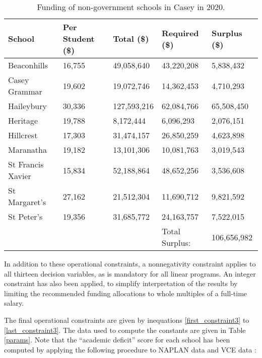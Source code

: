 \documentclass[11pt, a4paper]{article}
\begin{document}
    \begin{table}[!ht]
        \centering
        \caption{Funding of non-government schools in Casey in 2020.}
        \begin{tabular}{|l|l|l|l|l|}
        \hline
            School & Per Student (\$) & Total (\$) & Required (\$)  & Surplus (\$)  \\ \hline
            Beaconhills & 16,755 & 49,058,640 & 43,220,208 & 5,838,432  \\ \hline
            Casey Grammar & 19,602 & 19,072,746 & 14,362,453 & 4,710,293  \\ \hline
            Haileybury & 30,336 & 127,593,216 & 62,084,766 & 65,508,450  \\ \hline
            Heritage & 19,788 & 8,172,444 & 6,096,293 & 2,076,151  \\ \hline
            Hillcrest & 17,303 & 31,474,157 & 26,850,259 & 4,623,898  \\ \hline
            Maranatha & 19,182 & 13,101,306 & 10,081,763 & 3,019,543  \\ \hline
            St Francis Xavier & 15,834 & 52,188,864 & 48,652,256 & 3,536,608  \\ \hline
            St Margaret's & 27,162 & 21,512,304 & 11,690,712 & 9,821,592  \\ \hline
            St Peter's & 19,356 & 31,685,772 & 24,163,757 & 7,522,015  \\ \hline
            ~ & ~ & ~ & Total Surplus: & 106,656,982  \\ \hline
        \end{tabular}
        \label{private_funding}
    \end{table}

    In addition to these operational constraints, a nonnegativity constraint applies to all thirteen decision variables, as is mandatory for all linear programs. An integer constraint has also been applied, to simplify interpretation of the results by limiting the recommended funding allocations to whole multiples of a full-time salary. 

    The final operational constraints are given by inequations \ref{first_constraint3} to \ref{last_constraint3}. The data used to compute the constants are given in Table \ref{params}. Note that the ``academic deficit'' score for each school has been computed by applying the following procedure to NAPLAN data \parencite{naplan} and VCE data \parencite{vce_scores}:
\end{document}
